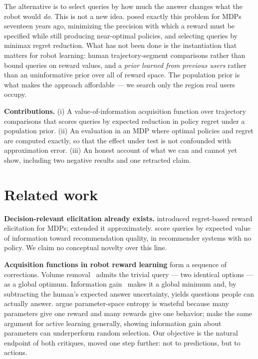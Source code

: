 \documentclass[10pt]{article}
\begin{document}
The alternative is to select queries by how much the answer changes what the
robot would \emph{do}. This is not a new idea. \citet{regan2009} posed exactly
this problem for MDPs seventeen years ago, minimizing the precision with which a
reward must be specified while still producing near-optimal policies, and
selecting queries by minimax regret reduction. What has not been done is the
instantiation that matters for robot learning: human trajectory-segment
comparisons rather than bound queries on reward values, and a \emph{prior
learned from previous users} rather than an uninformative prior over all of
reward space. The population prior is what makes the approach affordable ---
we search only the region real users occupy.

\textbf{Contributions.} (i) A value-of-information acquisition function over
trajectory comparisons that scores queries by expected reduction in policy
regret under a population prior. (ii) An evaluation in an MDP where optimal
policies and regret are computed exactly, so that the effect under test is not
confounded with approximation error. (iii) An honest account of what we can and
cannot yet show, including two negative results and one retracted claim.

\section{Related work}

\textbf{Decision-relevant elicitation already exists.} \citet{regan2009}
introduced regret-based reward elicitation for MDPs; \citet{alizadeh2015}
extended it approximately. \citet{modelfreepe2024} score queries by expected
value of information toward recommendation quality, in recommender systems with
no policy. We claim no conceptual novelty over this line.

\textbf{Acquisition functions in robot reward learning} form a sequence of
corrections. Volume removal~\citep{sadigh2017} admits the trivial query --- two
identical options --- as a global optimum. Information gain~\citep{biyik2019}
makes it a global minimum and, by subtracting the human's expected answer
uncertainty, yields questions people can actually answer. \citet{biyik2024}
argue parameter-space entropy is wasteful because many parameters give one
reward and many rewards give one behavior; \citet{bickfordsmith2023} make the
same argument for active learning generally, showing information gain about
parameters can underperform random selection. Our objective is the natural
endpoint of both critiques, moved one step further: not to predictions, but to
actions.
\end{document}
